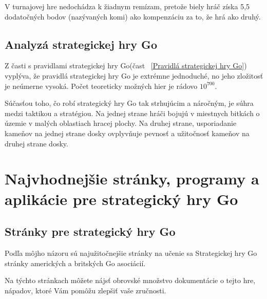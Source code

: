 \documentclass[10pt,twoside,slovak,a4paper]{article}
\begin{document}
V turnajovej hre nedochádza k žiadnym remízam, pretože biely hráč získa 5,5 dodatočných bodov (nazývaných komi) ako kompenzáciu za to, že hrá ako druhý.\cite{10.1145/792548.611939}

\subsection{Analyzá strategickej hry Go}
Z časti s pravidlami strategickej hry Go(čast ~\ref{Pravidlá strategickej hry Go}) vyplýva, že pravidlá strategickej hry Go je extrémne jednoduché, no jeho zložitosť je neúmerne vysoká. Počet teoreticky možných hier je rádovo $10^{700}$.\cite{10.1145/792548.611939}

Súčasťou toho, čo robí strategický hry Go tak strhujúcim a náročným, je súhra medzi taktikou a stratégiou. Na jednej strane hráči bojujú v miestnych bitkách o územie v malých oblastiach hracej plochy. Na druhej strane, usporiadanie kameňov na jednej strane dosky ovplyvňuje pevnosť a užitočnosť kameňov na druhej strane dosky.\cite{7471613}

\section{ Najvhodnejšie stránky, programy a aplikácie pre strategický hry Go }
\subsection{Stránky pre strategický hry Go}
Podľa môjho názoru sú najužitočnejšie stránky na učenie sa Strategickej hry Go stránky amerických a britských Go asociácií. \cite{britGo}\cite{usGo}

Na týchto stránkach môžete nájsť obrovské množstvo dokumentácie o tejto hre, nápadov, ktoré Vám pomôžu zlepšiť vaše zručnosti.
\end{document}

